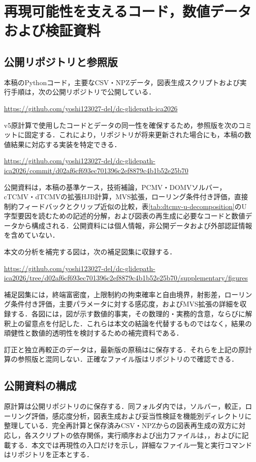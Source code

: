 \documentclass[10pt,a4paper]{article}
\theoremstyle{plain}
\theoremstyle{definition}
\begin{document}
\section{再現可能性を支えるコード，数値データおよび検証資料}
\label{app:reproducibility}

\subsection{公開リポジトリと参照版}

本稿のPythonコード，主要なCSV・NPZデータ，図表生成スクリプトおよび実行手順は，次の公開リポジトリで公開している．
\begin{center}
\url{https://github.com/yoshi123027-del/dc-glidepath-ica2026}
\end{center}
v5原計算で使用したコードとデータの同一性を確保するため，参照版を次のコミットに固定する．これにより，リポジトリが将来更新された場合にも，本稿の数値結果に対応する実装を特定できる．
\begin{center}
\url{https://github.com/yoshi123027-del/dc-glidepath-ica2026/commit/d02af6cf693ec701396c2ef8879c4b1b52e25b70}
\end{center}
公開資料は，本稿の基準ケース，技術補論，PCMV・DOMVソルバー，cTCMV・dTCMVの拡張HJB計算，MVS拡張，ローリング条件付き評価，直接制約フィードバックとクリップ近似の比較，表\ref{tab:dtcmv-u-decomposition}のU字型要因を読むための記述的分解，および図表の再生成に必要なコードと数値データから構成される．公開資料には個人情報，非公開データおよび外部認証情報を含めていない．

本文の分析を補完する図は，次の補足図集に収録する．
\begin{center}
\url{https://github.com/yoshi123027-del/dc-glidepath-ica2026/tree/d02af6cf693ec701396c2ef8879c4b1b52e25b70/supplementary/figures}
\end{center}
補足図集には，終端富密度，上限制約の拘束確率と自由境界，射影差，ローリング条件付き評価，主要パラメータに対する感応度，およびMVS拡張の詳細を収録する．各図には，図が示す数値的事実，その数理的・実務的含意，ならびに解釈上の留意点を付記した．これらは本文の結論を代替するものではなく，結果の頑健性と数値的透明性を検討するための補完資料である．

訂正と独立再較正のデータは，最新版の原稿はに保存する．それらを上記の原計算の参照版と混同しない．正確なファイル版はリポジトリので確認できる．
\subsection{公開資料の構成}
原計算は公開リポジトリのに保存する．同フォルダ内では，ソルバー，較正，ローリング評価，感応度分析，図表生成および妥当性検証を機能別ディレクトリに整理している．完全再計算と保存済みCSV・NPZからの図表再生成の双方に対応し，各スクリプトの依存関係，実行順序および出力ファイルは，，およびに記載する．本文では再現性の入口だけを示し，詳細なファイル一覧と実行コマンドはリポジトリを正本とする．
\end{document}
